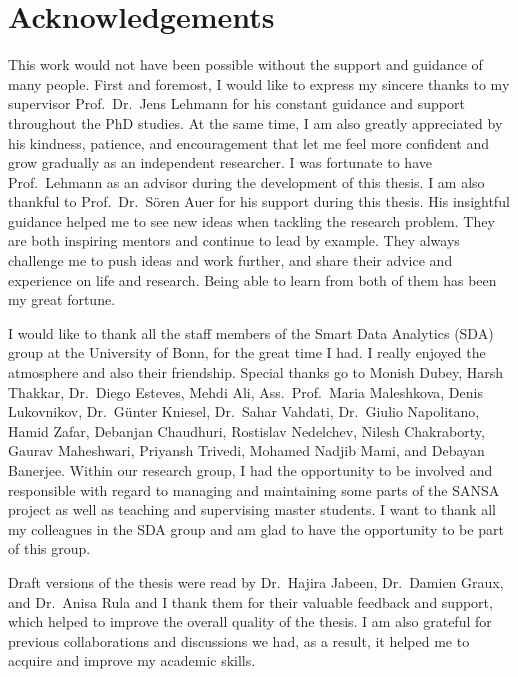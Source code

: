 \chapter*{Acknowledgements}
\label{sec:ack}
This work would not have been possible without the support and guidance of many people.
First and foremost, I would like to express my sincere thanks to my supervisor Prof.\ Dr.\ Jens Lehmann for his constant guidance and support throughout the PhD studies.
At the same time, I am also greatly appreciated by his kindness, patience, and encouragement that let me feel more confident and grow gradually as an independent researcher.
I was fortunate to have Prof.\ Lehmann as an advisor during the development of this thesis.
I am also thankful to Prof.\ Dr.\ S{\"o}ren Auer for his support during this thesis.
His insightful guidance helped me to see new ideas when tackling the research problem.
They are both inspiring mentors and continue to lead by example. 
They always challenge me to push ideas and work further, and share their advice and experience on life and research. 
Being able to learn from both of them has been my great fortune.

I would like to thank all the staff members of the Smart Data Analytics (SDA) group at the University of Bonn, for the great time I had.
I really enjoyed the atmosphere and also their friendship.
Special thanks go to Monish Dubey, Harsh Thakkar, Dr.\ Diego Esteves, Mehdi Ali, Ass.\ Prof.\ Maria Maleshkova, Denis Lukovnikov, Dr.\ G{\"{u}}nter Kniesel, Dr.\ Sahar Vahdati, Dr.\ Giulio Napolitano, Hamid Zafar, Debanjan Chaudhuri, Rostislav Nedelchev, Nilesh Chakraborty, Gaurav Maheshwari, Priyansh Trivedi, Mohamed Nadjib Mami, and Debayan Banerjee.
Within our research group, I had the opportunity to be involved and responsible with regard to managing and maintaining some parts of the SANSA project as well as teaching and supervising master students.
I want to thank all my colleagues in the SDA group and am glad to have the opportunity to be part of this group.

Draft versions of the thesis were read by Dr.\ Hajira Jabeen, Dr.\ Damien Graux, and Dr.\ Anisa Rula and I thank them for their valuable feedback and support, which helped to improve the overall quality of the thesis.
I am also grateful for previous collaborations and discussions we had, as a result, it helped me to acquire and improve my academic skills.

